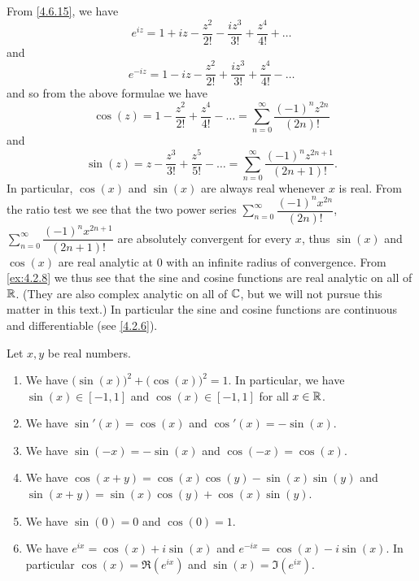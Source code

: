 \begin{ac}\label{ac:4.7.1}
  From \cref{4.6.15}, we have
  \[
    e^{i z} = 1 + i z - \dfrac{z^2}{2!} - \dfrac{i z^3}{3!} + \dfrac{z^4}{4!} + \dots
  \]
  and
  \[
    e^{- i z} = 1 - i z - \dfrac{z^2}{2!} + \dfrac{i z^3}{3!} + \dfrac{z^4}{4!} - \dots
  \]
  and so from the above formulae we have
  \[
    \cos(z) = 1 - \dfrac{z^2}{2!} + \dfrac{z^4}{4!} - \dots = \sum_{n = 0}^\infty \dfrac{(-1)^n z^{2n}}{(2n)!}
  \]
  and
  \[
    \sin(z) = z - \dfrac{z^3}{3!} + \dfrac{z^5}{5!} - \dots = \sum_{n = 0}^\infty \dfrac{(-1)^n z^{2n + 1}}{(2n + 1)!}.
  \]
  In particular, \(\cos(x)\) and \(\sin(x)\) are always real whenever \(x\) is real.
  From the ratio test we see that the two power series \(\sum_{n = 0}^\infty \dfrac{(-1)^n x^{2n}}{(2n)!}\), \(\sum_{n = 0}^\infty \dfrac{(-1)^n x^{2n + 1}}{(2n + 1)!}\) are absolutely convergent for every \(x\), thus \(\sin(x)\) and \(\cos(x)\) are real analytic at \(0\) with an infinite radius of convergence.
  From \cref{ex:4.2.8} we thus see that the sine and cosine functions are real analytic on all of \(\mathbb{R}\).
  (They are also complex analytic on all of \(\mathbb{C}\), but we will not pursue this matter in this text.)
  In particular the sine and cosine functions are continuous and differentiable (see \cref{4.2.6}).
\end{ac}

\begin{thm}\label{4.7.2}
  Let \(x, y\) be real numbers.
  \begin{enumerate}
    \item We have \(\big(\sin(x)\big)^2 + \big(\cos(x)\big)^2 = 1\).
          In particular, we have \(\sin(x) \in [-1, 1]\) and \(\cos(x) \in [-1, 1]\) for all \(x \in \mathbb{R}\).
    \item We have \(\sin'(x) = \cos(x)\) and \(\cos'(x) = -\sin(x)\).
    \item We have \(\sin(-x) = -\sin(x)\) and \(\cos(-x) = \cos(x)\).
    \item We have \(\cos(x + y) = \cos(x) \cos(y) - \sin(x) \sin(y)\) and \(\sin(x + y) = \sin(x) \cos(y) + \cos(x) \sin(y)\).
    \item We have \(\sin(0) = 0\) and \(\cos(0) = 1\).
    \item We have \(e^{i x} = \cos(x) + i \sin(x)\) and \(e^{- i x} = \cos(x) - i \sin(x)\).
          In particular \(\cos(x) = \Re(e^{i x})\) and \(\sin(x) = \Im(e^{i x})\).
  \end{enumerate}
\end{thm}

